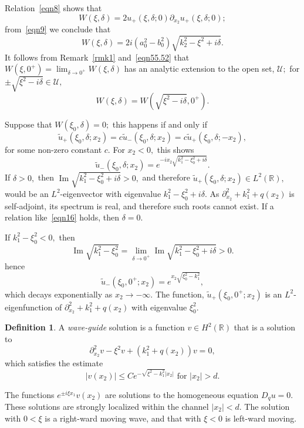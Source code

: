 \documentclass[11pt]{article}
\newcommand\cU{\mathcal U}
\newcommand\tu{\widetilde u}
\renewcommand\Im{\operatorname{Im}}
\newcommand\bbR{\mathbb R}
\newcommand\pa{\partial}
\theoremstyle{definition}
\newtheorem{definition}{Definition}
\theoremstyle{remark}
\begin{document}
Relation~\eqref{eqn8} shows that
\begin{equation}\label{eqn55.52}
  W(\xi,\delta)=2u_+(\xi,\delta;0)\pa_{x_2}u_+(\xi,\delta;0);
\end{equation}
from~\eqref{eqn9} we conclude that
\begin{equation}
   W(\xi,\delta)=2i (a_0^2-b_0^2)\sqrt{k^2_2-\xi^2+i\delta}.
\end{equation}
It follows from Remark~\ref{rmk1} and~\eqref{eqn55.52} that $W(\xi,0^+)=\lim_{\delta\to
  0^+}W(\xi,\delta)$ has an analytic extension to the open set,
$\cU;$  for $\pm\sqrt{\xi^2-i\delta}\in\cU,$
\begin{equation}\label{eqn225.81}
  W(\xi,\delta)= W(\sqrt{\xi^2-i\delta},0^+).
  \end{equation}

Suppose that $W(\xi_0,\delta)=0;$ this happens if and only if
\begin{equation}\label{eqn16}
  \tu_+(\xi_0,\delta;x_2)=c\tu_-(\xi_0,\delta;x_2)=c\tu_+(\xi_0,\delta;-x_2),
\end{equation}
for some non-zero constant $c.$
For $x_2<0,$ this shows
\begin{equation}
  \tu_-(\xi_0,\delta;x_2)=e^{-ix_2\sqrt{k_1^2-\xi_0^2+i\delta}}.
\end{equation}
If $\delta> 0,$ then $\Im \sqrt{k_1^2-\xi_0^2+i\delta}>0,$ and
therefore $\tu_+(\xi_0,\delta;x_2)\in L^2(\bbR),$ would be an
$L^2$-eigenvector with eigenvalue $k_1^2-\xi_0^2+i\delta.$ As
$\pa_{x_2}^2+k_1^2+q(x_2)$ is self-adjoint, its spectrum is real,
and therefore such roots cannot exist. If a relation like~\eqref{eqn16} holds, then $\delta=0.$

If $k_1^2-\xi_0^2<0,$ then
\begin{equation}
  \Im \sqrt{k_1^2-\xi_0^2}=\lim_{\delta\to 0^+}\Im \sqrt{k_1^2-\xi_0^2+i\delta}>0.
\end{equation}
hence
\begin{equation}
  \tu_-(\xi_0,0^+;x_2)=e^{x_2\sqrt{\xi_0^2-k_1^2}},
\end{equation}
which decays exponentially as $x_2\to-\infty.$  The
function, $\tu_+(\xi_0,0^+;x_2)$ is an $L^2$-eigenfunction of
$\pa_{x_2}^2+k_1^2+q(x_2)$ with eigenvalue $\xi_0^2.$

\begin{definition}
 A \emph{wave-guide} solution is a function $v\in H^2(\bbR)$ that is a solution to
\begin{equation}
  \pa_{x_2}^2v-\xi^2v+(k_1^2+q(x_2))v=0,
\end{equation}
which satisfies the estimate
\begin{equation}
  |v(x_2)|\leq Ce^{-\sqrt{\xi^2-k_1^2}|x_2|}\text{ for }|x_2|>d.
\end{equation}
\end{definition}
The functions $e^{\pm i\xi x_1}v(x_2)$ are solutions to the homogeneous equation
$D_{q}u=0.$ These solutions are strongly localized within the channel $|x_2|<d.$
The solution with $0<\xi$ is a right-ward moving wave, and that with $\xi<0$ is
left-ward moving.
\end{document}
